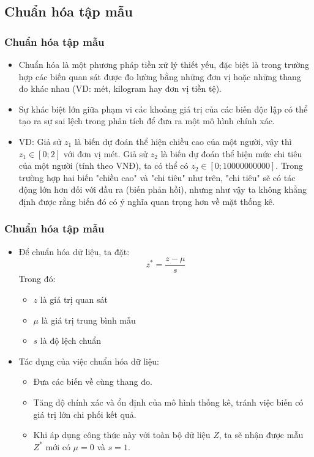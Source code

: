\begin{footnotesize}
\subsection{Chuẩn hóa tập mẫu}
\begin{frame}
\frametitle{Chuẩn hóa tập mẫu}
	\begin{itemize}
    \item Chuẩn hóa là một phương pháp tiền xử lý thiết yếu, đặc biệt là trong trường hợp các biến quan sát được đo lường bằng những đơn vị hoặc những thang đo khác nhau (VD: mét, kilogram hay đơn vị tiền tệ). 
    \item Sự khác biệt lớn giữa phạm vi các khoảng giá trị của các biến độc lập có thể tạo ra sự sai lệch trong phân tích để đưa ra một mô hình chính xác. 
    \item VD: Giả sử $z_1$ là biến dự đoán thể hiện chiều cao của một người, vậy thì $z_1 \in [0;2]$ với đơn vị mét. Giả sử $z_2$ là biến dự đoán thể hiện mức chi tiêu của một người (tính theo VNĐ), ta có thể có $z_2 \in [0;10 000 000 000]$. Trong trường hợp hai biến "chiều cao" và "chi tiêu" như trên, "chi tiêu" sẽ có tác động lớn hơn đối với đầu ra (biến phản hồi), nhưng như vậy ta không khẳng định được rằng biến đó có ý nghĩa quan trọng hơn về mặt thống kê. 
\end{itemize}
\end{frame}
\begin{frame}
\frametitle{Chuẩn hóa tập mẫu}
	\begin{itemize}
	\item Để chuẩn hóa dữ liệu, ta đặt:
   \[
   z^* = \dfrac{z- \mu}{s}
   \]
   Trong đó:
   \begin{itemize}
       \item $z$ là giá trị quan sát
       \item $\mu$ là giá trị trung bình mẫu
       \item $s$ là độ lệch chuẩn
   \end{itemize}
   \item Tác dụng của việc chuẩn hóa dữ liệu:
   \begin{itemize}
       \item Đưa các biến về cùng thang đo.
       \item Tăng độ chính xác và ổn định của mô hình thống kê, tránh việc biến có giá trị lớn chi phối kết quả.
       \item Khi áp dụng công thức này với toàn bộ dữ liệu $Z$, ta sẽ nhận được mẫu $Z^*$ mới có $\mu = 0$ và $s=1$.
   \end{itemize}
	\end{itemize}
\end{frame}

\end{footnotesize}
